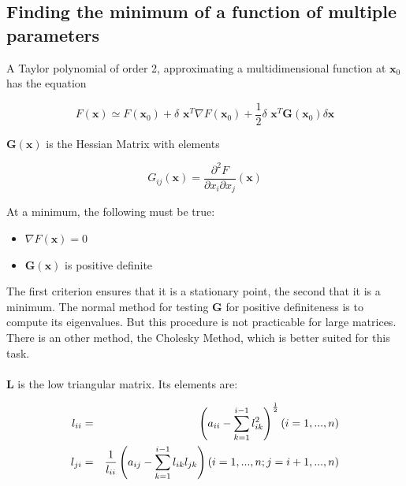 \documentclass[a4paper,14pt]{extbook}
\begin{document}
\subsection{Finding the minimum of a function of multiple parameters}

A Taylor polynomial of order 2, approximating a multidimensional function at $\textbf{x}_0$ has the equation

\begin{equation}
F(\textbf{x} )\simeq F( \textbf{x}_0) + \delta \textbf{ x}^T \nabla F( \textbf{x}_0 )  + \frac{1}{2}  \delta \textbf{ x}^T \textbf{G}( \textbf{x}_0 ) \delta \textbf{x}
\end{equation}


$\textbf{G}( \textbf{x} )$ is the Hessian Matrix with elements

\begin{equation}
G_{ij}(\textbf{x} )=\frac{\partial^2 F}{\partial x_i \partial x_j}(\textbf{x})
\end{equation}

At a minimum, the following must be true:

\begin{itemize}
\item  $\nabla F( \textbf{x} )=0$
\item  $\textbf{G}( \textbf{x} )$ is positive definite
\end{itemize}

The first criterion ensures that it is a stationary point, the second that it is a minimum. The normal method for testing \textbf{G} for positive definiteness is to compute its eigenvalues. But this procedure is not practicable for large matrices. There is an other method, the Cholesky Method, which is better suited for this task.\\


\\


\textbf{L} is the low triangular matrix. Its elements are:

\begin{eqnarray}
l_{ii}&=&\left( a_{ii}-\sum^{i-1}_{k=1} l^2_{ik} \right) ^\frac{1}{2}\bigskip (i=1,...,n)\\
l_{ji}&=&\frac{1}{l_{ii}}\left( a_{ij}-\sum^{i-1}_{k=1} l_{ik} l_{jk}\right) \bigskip (i=1,...,n;j=i+1,...,n)
\end{eqnarray}
\end{document}
